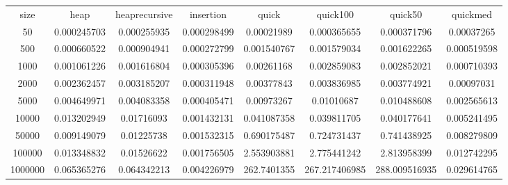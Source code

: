\begin{table}
\begin{tabular}{cccccccc}
size & heap & heaprecursive & insertion & quick & quick100 & quick50 & quickmed \\
50 & 0.000245703 & 0.000255935 & 0.000298499 & 0.00021989 & 0.000365655 & 0.000371796 & 0.00037265 \\
500 & 0.000660522 & 0.000904941 & 0.000272799 & 0.001540767 & 0.001579034 & 0.001622265 & 0.000519598 \\
1000 & 0.001061226 & 0.001616804 & 0.000305396 & 0.00261168 & 0.002859083 & 0.002852021 & 0.000710393 \\
2000 & 0.002362457 & 0.003185207 & 0.000311948 & 0.00377843 & 0.003836985 & 0.003774921 & 0.00097031 \\
5000 & 0.004649971 & 0.004083358 & 0.000405471 & 0.00973267 & 0.01010687 & 0.010488608 & 0.002565613 \\
10000 & 0.013202949 & 0.01716093 & 0.001432131 & 0.041087358 & 0.039811705 & 0.040177641 & 0.005241495 \\
50000 & 0.009149079 & 0.01225738 & 0.001532315 & 0.690175487 & 0.724731437 & 0.741438925 & 0.008279809 \\
100000 & 0.013348832 & 0.01526622 & 0.001756505 & 2.553903881 & 2.775441242 & 2.813958399 & 0.012742295 \\
1000000 & 0.065365276 & 0.064342213 & 0.004226979 & 262.7401355 & 267.217406985 & 288.009516935 & 0.029614765 \\
\end{tabular}
\end{table}
